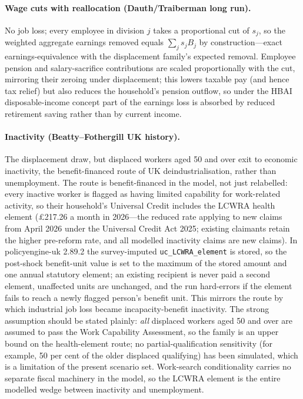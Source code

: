 \paragraph{Wage cuts with reallocation (Dauth/Traiberman long run).} No job loss; every employee in division $j$ takes a proportional cut of $s_j$, so the weighted aggregate earnings removed equals $\sum_j s_j B_j$ by construction---exact earnings-equivalence with the displacement family's expected removal. Employee pension and salary-sacrifice contributions are scaled proportionally with the cut, mirroring their zeroing under displacement; this lowers taxable pay (and hence tax relief) but also reduces the household's pension outflow, so under the HBAI disposable-income concept part of the earnings loss is absorbed by reduced retirement saving rather than by current income.
\paragraph{Inactivity (Beatty--Fothergill UK history).} The displacement draw, but displaced workers aged 50 and over exit to economic inactivity, the benefit-financed route of UK deindustrialisation, rather than unemployment. The route is benefit-financed in the model, not just relabelled: every inactive worker is flagged as having limited capability for work-related activity, so their household's Universal Credit includes the LCWRA health element (\pounds 217.26 a month in 2026---the reduced rate applying to new claims from April 2026 under the Universal Credit Act 2025; existing claimants retain the higher pre-reform rate, and all modelled inactivity claims are new claims). In policyengine-uk 2.89.2 the survey-imputed \texttt{uc\_LCWRA\_element} is stored, so the post-shock benefit-unit value is set to the maximum of the stored amount and one annual statutory element; an existing recipient is never paid a second element, unaffected units are unchanged, and the run hard-errors if the element fails to reach a newly flagged person's benefit unit. This mirrors the \citet{beatty2007} route by which industrial job loss became incapacity-benefit inactivity. The strong assumption should be stated plainly: \emph{all} displaced workers aged 50 and over are assumed to pass the Work Capability Assessment, so the family is an upper bound on the health-element route; no partial-qualification sensitivity (for example, 50 per cent of the older displaced qualifying) has been simulated, which is a limitation of the present scenario set. Work-search conditionality carries no separate fiscal machinery in the model, so the LCWRA element is the entire modelled wedge between inactivity and unemployment.


